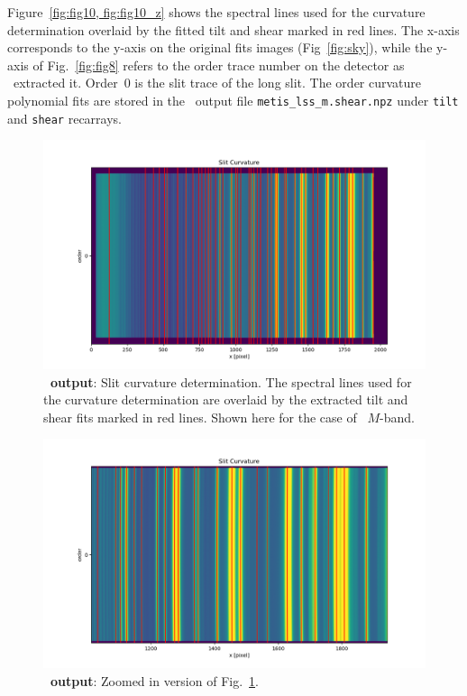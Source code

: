 Figure~\ref{fig:fig10, fig:fig10_z} shows the spectral lines used for the curvature determination  overlaid by the fitted tilt and shear marked in red lines. The x-axis corresponds to the y-axis on the original fits images (Fig~\ref{fig:sky}), while the y-axis of Fig.~\ref{fig:fig8} refers to the order trace number on the detector as \pyred~extracted it. Order~0 is the slit trace of the long slit. The order curvature polynomial fits are stored in the \pyred~output file \texttt{metis\_lss\_m.shear.npz} under \texttt{tilt} and \texttt{shear} recarrays.
\begin{figure}[!h]
  \centering
  \includegraphics[width=\textwidth]{figures/LSS_CrtAlg_files/Figure_10.png}
  \caption{\textbf{\pyred~output}: Slit curvature determination. The spectral lines used for the curvature determination are overlaid by the extracted tilt and shear fits marked in red lines. Shown here for the case of \lss~$M$-band.}
  \label{fig:fig10}
\end{figure}
\begin{figure}[!h]
  \centering
  \includegraphics[width=\textwidth]{figures/LSS_CrtAlg_files/Figure_10_z.png}
  \caption{\textbf{\pyred~output}: Zoomed in version of Fig.~\ref{fig:fig10}.}
  \label{fig:fig10_z}
\end{figure}
